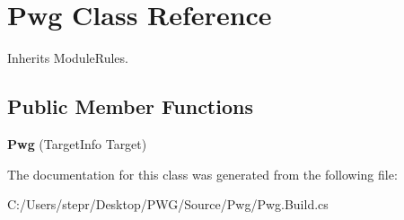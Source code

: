 \hypertarget{class_pwg}{}\section{Pwg Class Reference}
\label{class_pwg}


Inherits Module\+Rules.

\subsection*{Public Member Functions}
\begin{DoxyCompactItemize}
\item 
\mbox{\label{class_pwg_af47187d9af1934d9854cba29e0b1694b}} 
{\bfseries Pwg} (Target\+Info Target)
\end{DoxyCompactItemize}


The documentation for this class was generated from the following file\+:\begin{DoxyCompactItemize}
\item 
C\+:/\+Users/stepr/\+Desktop/\+P\+W\+G/\+Source/\+Pwg/Pwg.\+Build.\+cs\end{DoxyCompactItemize}
